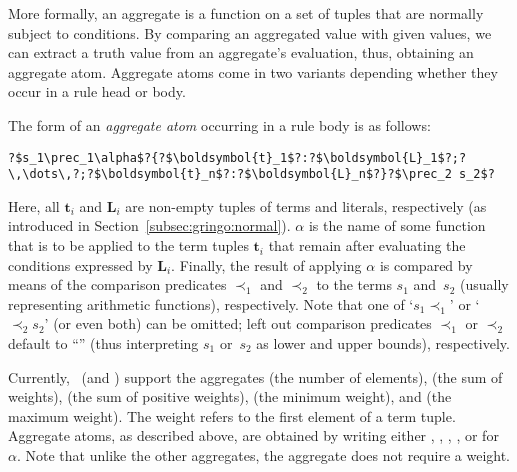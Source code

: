 More formally,
an aggregate is a function on a set of tuples that are normally subject to conditions. 
By comparing an aggregated value with given values, we can extract a truth value from an aggregate's evaluation,
thus, obtaining an aggregate atom.
Aggregate atoms come in two variants depending whether they occur in a rule head or body.

The form of an \emph{aggregate atom} occurring in a rule body is as follows:
%
\begin{lstlisting}[numbers=none,escapechar=?]
?$s_1\prec_1\alpha$?{?$\boldsymbol{t}_1$?:?$\boldsymbol{L}_1$?;?\,\dots\,?;?$\boldsymbol{t}_n$?:?$\boldsymbol{L}_n$?}?$\prec_2 s_2$?
\end{lstlisting}
%
Here, all $\boldsymbol{t}_i$ and $\boldsymbol{L}_i$ are non-empty tuples of terms and literals, respectively
(as introduced in Section~\ref{subsec:gringo:normal}). 
$\alpha$ is the name of some function that is to be applied to the term tuples $\boldsymbol{t}_i$
that remain after evaluating the conditions expressed by $\boldsymbol{L}_i$.
%
Finally, 
the result of applying $\alpha$ is compared by means of the comparison predicates $\prec_1$ and $\prec_2$ 
to the terms $s_1$ and~$s_2$ (usually representing arithmetic functions), respectively.
Note that one of `$s_1\prec_1$' or `$\prec_2 s_2$'%
(or even both) can be omitted;
left out comparison predicates $\prec_1$ or $\prec_2$ default to ``\code{<=}'' (thus interpreting $s_1$ or~$s_2$ as lower and upper bounds),
respectively.

Currently, \gringo\ (and \clingo) support the aggregates 
%
(the number of elements), 
%
(the sum of weights), 
%
(the sum of positive weights), 
%
(the minimum weight), and
%
(the maximum weight).
The weight refers to the first element of a term tuple.
Aggregate atoms, as described above, are obtained by writing
either , , , , or  for $\alpha$.
%
Note that unlike the other aggregates, the  aggregate does not require a weight.

